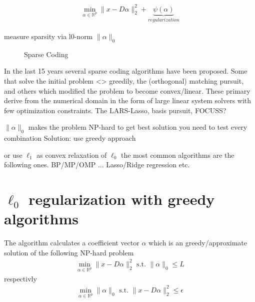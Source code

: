 \begin{align}
\min_{\alpha\in\mathbb{R}^{p}} \lVert x - D\alpha \rVert^{2}_{2} + \underbrace{\psi(\alpha)}_{regularization}
\end{align}


measure sparsity via       l0-norm       $\lVert\alpha\rVert_{0}$

\begin{figure}
\centering
\caption{Sparse Coding}
\label{fig:da_x}
\end{figure}


In the last 15 years several sparse coding algorithms have been proposed. 
Some that solve the initial problem <> greedily, the (orthogonal) matching pursuit, and others which modified the problem to become convex/linear. These primary derive from the numerical domain in the form of 
large linear system solvers with few optimization constraints. The LARS-Lasso, basis pursuit, FOCUSS?


$\lVert\alpha\rVert_{0}$ makes the problem NP-hard
to get best solution you need to test every combination
Solution:
use greedy approach 

or use $\ell_1$ as convex relaxation of $\ell_0$
the most common algorithms are the following ones.
BP/MP/OMP ...
Lasso/Ridge regression etc.



\section{$\ell_0$ regularization with greedy algorithms}

The algorithm calculates a coefficient vector $\alpha$ which is an greedy/approximate solution of the following NP-hard problem
\begin{align}
\min_{\alpha\in\mathbb{R}^{p}}  \lVert x - D\alpha \rVert^{2}_{2} \textrm{ s.t. } \lVert \alpha \rVert_{0} \leq L
\end{align}
respectivly
\begin{align}
\min_{\alpha\in\mathbb{R}^{p}}   \lVert \alpha \rVert_{0}   \textrm{ s.t. } \lVert x - D\alpha \rVert^{2}_{2} \leq \epsilon
\end{align}
\cite{Mallat1993}

